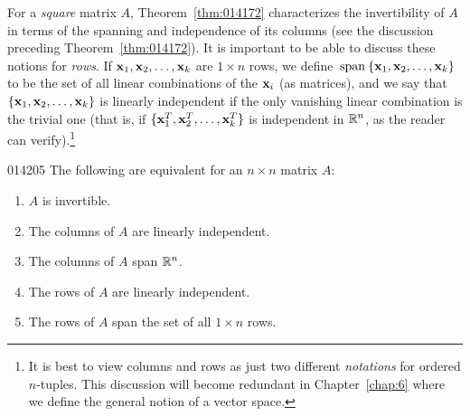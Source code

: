 For a \textit{square} matrix $A$, Theorem~\ref{thm:014172} characterizes the invertibility of $A$ in terms of the spanning and independence of its columns (see the discussion preceding Theorem~\ref{thm:014172}). It is important to be able to discuss these notions for \textit{rows}. If $\textbf{x}_{1}, \textbf{x}_{2}, \dots, \textbf{x}_{k}$ are $1 \times n$ rows, we define $\thinspace\operatorname{span\medspace}\{\textbf{x}_{1}, \textbf{x}_{2}, \dots, \textbf{x}_{k}\}$ to be the set of all linear combinations of the $\textbf{x}_{i}$ (as matrices), and we say that $\{\textbf{x}_{1}, \textbf{x}_{2}, \dots, \textbf{x}_{k}\}$ is linearly independent if the only vanishing linear combination is the trivial one (that is, if $\{\textbf{x}_1^T, \textbf{x}_2^T, \dots, \textbf{x}_k^T \}$ is independent in $\mathbb{R}^n$, as the reader can verify).\footnote{It is best to view columns and rows as just two different \textit{notations} for ordered $n$-tuples. This discussion will become redundant in Chapter~\ref{chap:6} where we define the general notion of a vector space.}

\begin{theorem}{}{014205} %
The following are equivalent for an $n \times n$ matrix $A$:

\begin{enumerate}
\item $A$ is invertible.

\item The columns of $A$ are linearly independent.

\item The columns of $A$ span $\mathbb{R}^n$.

\item The rows of $A$ are linearly independent.

\item The rows of $A$ span the set of all $1 \times n$ rows.

\end{enumerate}
\end{theorem}

